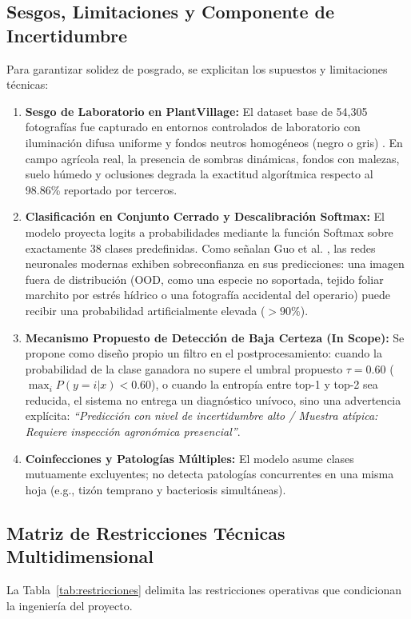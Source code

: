 \documentclass[12pt,letterpaper]{article}
\begin{document}
\subsection{Sesgos, Limitaciones y Componente de Incertidumbre}
Para garantizar solidez de posgrado, se explicitan los supuestos y limitaciones técnicas:
\begin{enumerate}[leftmargin=*]
    \item \textbf{Sesgo de Laboratorio en PlantVillage:} El dataset base de 54,305 fotografías fue capturado en entornos controlados de laboratorio con iluminación difusa uniforme y fondos neutros homogéneos (negro o gris) \cite{hughes2015open, mohanty2016using}. En campo agrícola real, la presencia de sombras dinámicas, fondos con malezas, suelo húmedo y oclusiones degrada la exactitud algorítmica respecto al 98.86\% reportado por terceros.
    \item \textbf{Clasificación en Conjunto Cerrado y Descalibración Softmax:} El modelo proyecta logits a probabilidades mediante la función Softmax sobre exactamente 38 clases predefinidas. Como señalan Guo et al. \cite{guo2017calibration}, las redes neuronales modernas exhiben sobreconfianza en sus predicciones: una imagen fuera de distribución (OOD, como una especie no soportada, tejido foliar marchito por estrés hídrico o una fotografía accidental del operario) puede recibir una probabilidad artificialmente elevada ($>90\%$).
    \item \textbf{Mecanismo Propuesto de Detección de Baja Certeza (In Scope):} Se propone como diseño propio un filtro en el postprocesamiento: cuando la probabilidad de la clase ganadora no supere el umbral propuesto $\tau = 0.60$ ($\operatorname{max}_i P(y=i|x) < 0.60$), o cuando la entropía entre top-1 y top-2 sea reducida, el sistema no entrega un diagnóstico unívoco, sino una advertencia explícita: \textit{``Predicción con nivel de incertidumbre alto / Muestra atípica: Requiere inspección agronómica presencial''}.
    \item \textbf{Coinfecciones y Patologías Múltiples:} El modelo asume clases mutuamente excluyentes; no detecta patologías concurrentes en una misma hoja (e.g., tizón temprano y bacteriosis simultáneas).
\end{enumerate}

\subsection{Matriz de Restricciones Técnicas Multidimensional}
La Tabla~\ref{tab:restricciones} delimita las restricciones operativas que condicionan la ingeniería del proyecto.
\end{document}
